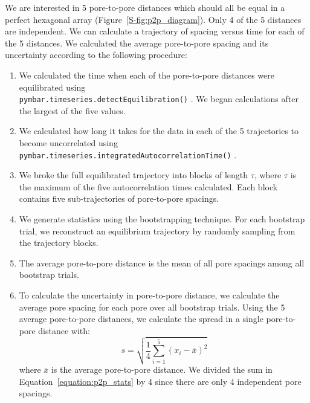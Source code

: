   We are interested in 5 pore-to-pore distances which should all be
  equal in a perfect hexagonal array (Figure~\ref{S-fig:p2p_diagram}). Only 4 of
  the 5 distances are independent. We can calculate a trajectory of spacing
  versus time for each of the 5 distances. We calculated the average pore-to-pore
  spacing and its uncertainty according to the following procedure:
   \begin{enumerate}
	\item We calculated the time when each of the pore-to-pore distances
	were equilibrated using \\ \texttt{pymbar.timeseries.detectEquilibration()}
	\cite{chodera_simple_2016,shirts_statistically_2008}. We began calculations
	after the largest of the five values.
	\item We calculated how long it takes for the data in each of the 5
	trajectories to become uncorrelated using \texttt{pymbar.timeseries.integratedAutocorrelationTime()}
	\cite{chodera_simple_2016,shirts_statistically_2008}. 
	\item We broke the full equilibrated trajectory into blocks of length $\tau$, where
	$\tau$ is the maximum of the five autocorrelation times calculated. Each block contains
	five sub-trajectories of pore-to-pore spacings.   
	\item We generate statistics using the bootstrapping technique. For
	each bootstrap trial, we reconstruct an equilibrium trajectory by randomly
	sampling from the trajectory blocks. 
	\item The average pore-to-pore distance is the mean of all pore
	spacings among all bootstrap trials.
	\item To calculate the uncertainty in pore-to-pore distance, we calculate the average 
	pore spacing for each pore over all bootstrap trials. Using the 5 average 
	pore-to-pore distances, we calculate the spread in a single pore-to-pore distance 
	with:
	\begin{equation}
	s = \sqrt{\frac{1}{4} \sum_{i=1}^5 (x_i - \overline{x})^2} 
	\label{equation:p2p_stats}
	\end{equation}
	where $\overline{x}$ is the average pore-to-pore distance. We divided the sum in 
	Equation~\ref{equation:p2p_stats} by 4 since there are only 4 independent pore
	spacings.
  \end{enumerate}
  
  
